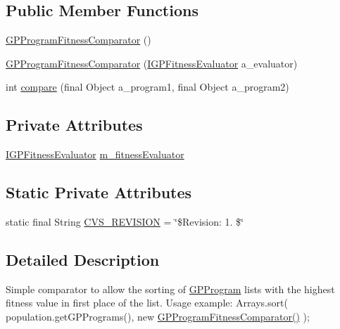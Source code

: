 \subsection*{Public Member Functions}
\begin{DoxyCompactItemize}
\item 
\hyperlink{classorg_1_1jgap_1_1gp_1_1impl_1_1_g_p_program_fitness_comparator_aa9df754c30f97f7910ef94d0829feb58}{G\-P\-Program\-Fitness\-Comparator} ()
\item 
\hyperlink{classorg_1_1jgap_1_1gp_1_1impl_1_1_g_p_program_fitness_comparator_a4d90c156ded8c00c8065df16c44b2cbe}{G\-P\-Program\-Fitness\-Comparator} (\hyperlink{interfaceorg_1_1jgap_1_1gp_1_1_i_g_p_fitness_evaluator}{I\-G\-P\-Fitness\-Evaluator} a\-\_\-evaluator)
\item 
int \hyperlink{classorg_1_1jgap_1_1gp_1_1impl_1_1_g_p_program_fitness_comparator_a6132392fd7160988e6f40907dfe6357d}{compare} (final Object a\-\_\-program1, final Object a\-\_\-program2)
\end{DoxyCompactItemize}
\subsection*{Private Attributes}
\begin{DoxyCompactItemize}
\item 
\hyperlink{interfaceorg_1_1jgap_1_1gp_1_1_i_g_p_fitness_evaluator}{I\-G\-P\-Fitness\-Evaluator} \hyperlink{classorg_1_1jgap_1_1gp_1_1impl_1_1_g_p_program_fitness_comparator_ac1ea9f31ce9be111529e158f7060d9cb}{m\-\_\-fitness\-Evaluator}
\end{DoxyCompactItemize}
\subsection*{Static Private Attributes}
\begin{DoxyCompactItemize}
\item 
static final String \hyperlink{classorg_1_1jgap_1_1gp_1_1impl_1_1_g_p_program_fitness_comparator_aa7bfbeaeb169225fcc3ce8e55e071eb7}{C\-V\-S\-\_\-\-R\-E\-V\-I\-S\-I\-O\-N} = \char`\"{}\$Revision\-: 1. \$\char`\"{}
\end{DoxyCompactItemize}


\subsection{Detailed Description}
Simple comparator to allow the sorting of \hyperlink{classorg_1_1jgap_1_1gp_1_1impl_1_1_g_p_program}{G\-P\-Program} lists with the highest fitness value in first place of the list. Usage example\-: Arrays.\-sort( population.\-get\-G\-P\-Programs(), new \hyperlink{classorg_1_1jgap_1_1gp_1_1impl_1_1_g_p_program_fitness_comparator_aa9df754c30f97f7910ef94d0829feb58}{G\-P\-Program\-Fitness\-Comparator()} );

